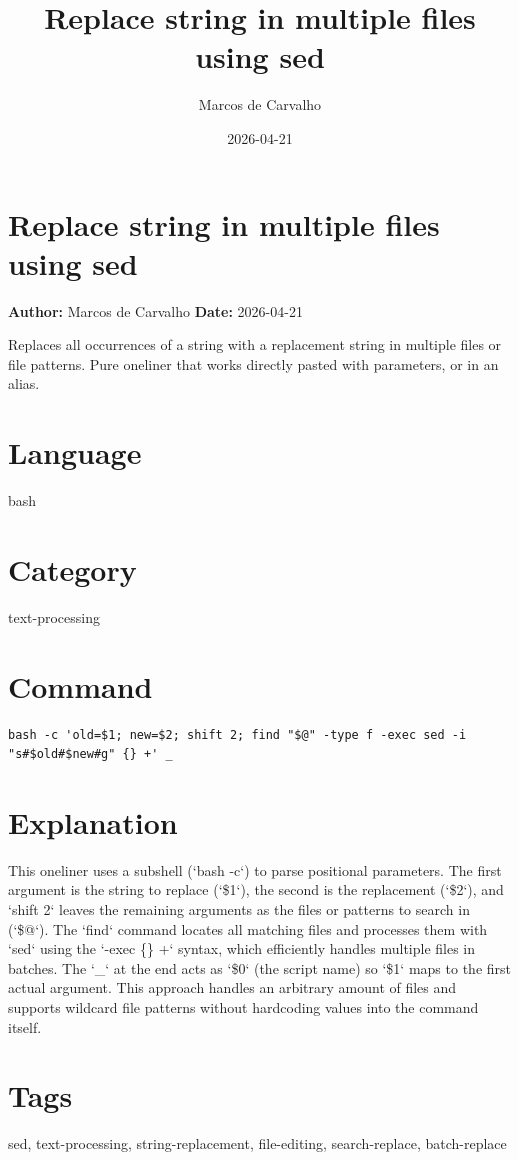 \documentclass{article}
\title{Replace string in multiple files using sed}
\author{Marcos de Carvalho}
\date{2026-04-21}
\begin{document}
\section*{Replace string in multiple files using sed}
\textbf{Author:} Marcos de Carvalho \hfill \textbf{Date:} 2026-04-21

\noindent Replaces all occurrences of a string with a replacement string in multiple files or file patterns. Pure oneliner that works directly pasted with parameters, or in an alias.

\section*{Language}
bash

\section*{Category}
text-processing

\section*{Command}
\begin{lstlisting}
bash -c 'old=$1; new=$2; shift 2; find "$@" -type f -exec sed -i "s#$old#$new#g" {} +' _
\end{lstlisting}

\section*{Explanation}
This oneliner uses a subshell (`bash -c`) to parse positional parameters. The first argument is the string to replace (`\$1`), the second is the replacement (`\$2`), and `shift 2` leaves the remaining arguments as the files or patterns to search in (`\$@`). The `find` command locates all matching files and processes them with `sed` using the `-exec \{\} +` syntax, which efficiently handles multiple files in batches. The `\_` at the end acts as `\$0` (the script name) so `\$1` maps to the first actual argument. This approach handles an arbitrary amount of files and supports wildcard file patterns without hardcoding values into the command itself.

\section*{Tags}
sed, text-processing, string-replacement, file-editing, search-replace, batch-replace
\end{document}
